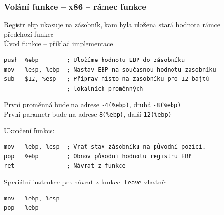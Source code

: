 \documentclass{beamer}
\begin{document}
\begin{frame}[fragile]
\frametitle{Volání funkce -- x86 -- rámec funkce}
Registr ebp ukazuje na zásobník, kam byla uložena stará hodnota rámce předchozí funkce\\
\bigskip
Úvod funkce – příklad implementace
\begin{verbatim}
push  %ebp        ; Uložíme hodnotu EBP do zásobníku
mov   %esp, %ebp  ; Nastav EBP na současnou hodnotu zasobníku
sub   $12, %esp   ; Připrav místo na zasobníku pro 12 bajtů
                  ; lokálních proměnných
\end{verbatim}

První proměnná bude na adrese \texttt{-4(\%ebp)}, druhá \texttt{-8(\%ebp)}\\
První parametr bude na adrese \texttt{8(\%ebp)}, další \texttt{12(\%ebp)}

Ukončení funkce:
\begin{verbatim}
mov   %ebp, %esp  ; Vrať stav zásobníku na původní pozici.
pop   %ebp        ; Obnov původní hodnotu registru EBP
ret               ; Návrat z funkce
\end{verbatim}

Speciální instrukce pro návrat z funkce:
\texttt{leave} vlastně: 
\begin{verbatim}
mov   %ebp, %esp 
pop   %ebp        
\end{verbatim}

\end{frame}
\end{document}
